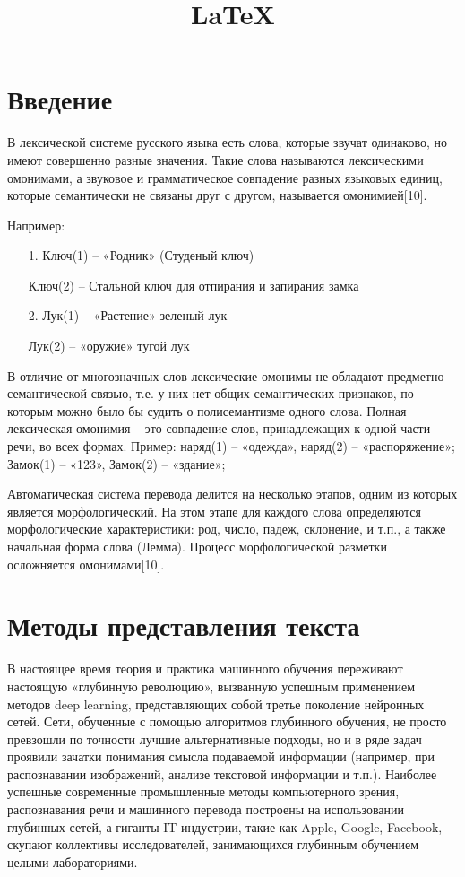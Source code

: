 \documentclass[12pt]{article}
\title{\LaTeX}
\date{}
\begin{document}
\def\dd#1#2{\frac{\partial#1}{\partial#2}}

\section{Введение}

В лексической системе русского языка есть слова, которые звучат одинаково, но имеют совершенно разные значения. Такие слова называются лексическими омонимами, а звуковое и грамматическое совпадение разных языковых единиц, которые семантически не связаны друг с другом, называется омонимией[10].

Например:
\begin{itemize}
\item[1.] Ключ(1) – «Родник» (Студеный ключ)
\item[] Ключ(2) – Стальной ключ для отпирания и запирания замка
\item[2.] Лук(1) – «Растение» зеленый лук
\item[] Лук(2) – «оружие» тугой лук
\end{itemize}

В отличие от многозначных слов лексические омонимы не обладают предметно-семантической связью, т.е. у них нет общих семантических признаков, по которым можно было бы судить о полисемантизме одного слова. Полная лексическая омонимия – это совпадение слов, принадлежащих к одной части речи, во всех формах. Пример: наряд(1) – «одежда», наряд(2) – «распоряжение»; Замок(1) – «123», Замок(2) – «здание»;

Автоматическая система перевода делится на несколько этапов, одним из которых является морфологический. На этом этапе для каждого слова определяются морфологические характеристики: род, число, падеж, склонение, и т.п., а также начальная форма слова (Лемма). Процесс морфологической разметки осложняется омонимами[10].
\section{Методы представления текста}
	В настоящее время теория и практика машинного обучения переживают настоящую «глубинную революцию», вызванную успешным применением методов deep learning, представляющих собой третье поколение нейронных сетей. Сети, обученные с помощью алгоритмов глубинного обучения, не просто превзошли по точности лучшие альтернативные подходы, но и в ряде задач проявили зачатки понимания смысла подаваемой информации (например, при распознавании изображений, анализе текстовой информации и т.п.). Наиболее успешные современные промышленные методы компьютерного зрения, распознавания речи и машинного перевода построены на использовании глубинных сетей, а гиганты IT-индустрии, такие как Apple, Google, Facebook, скупают коллективы исследователей, занимающихся глубинным обучением целыми лабораториями.
\end{document}
